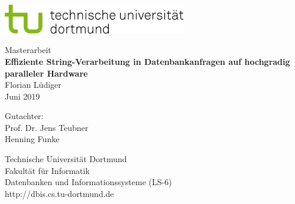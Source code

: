 \begin{titlepage}
	\vspace*{-2cm}
	\newlength{\links}
	\setlength{\links}{-1.2cm}
	\sffamily
	\hspace*{\links}
	
	\begin{minipage}{12.5cm}
		\includegraphics[width=8cm]{bilder/tud_logo_rgb}
	\end{minipage}
	
	\vspace*{4cm}
	
	\hspace*{\links}
	\hspace*{-0.2cm}
	\begin{minipage}{9cm}
		\large
		\begin{center}
			{\Large Masterarbeit} \\
			\vspace*{1cm}
			\textbf{Effiziente String-Verarbeitung in Datenbankanfragen auf hochgradig paralleler Hardware} \\
			\vspace*{1cm}
			Florian Lüdiger\\
			Juni 2019
		\end{center}
	\end{minipage}
	\normalsize
	\vspace*{4.5cm}
	
	
	\vspace*{2.1cm}
	
	\hspace*{\links}
	\begin{minipage}[b]{5cm}
		\raggedright
		Gutachter: \\
		Prof. Dr. Jens Teubner \\
		Henning Funke \\
	\end{minipage}
	
	\vspace*{2.5cm}
	\hspace*{\links}
	\begin{minipage}[b]{8cm}
		\raggedright
		Technische Universität Dortmund \\
		Fakultät für Informatik\\
		Datenbanken und Informationssysteme (LS-6)\\
		http://dbis.cs.tu-dortmund.de
	\end{minipage}
	
\end{titlepage}
